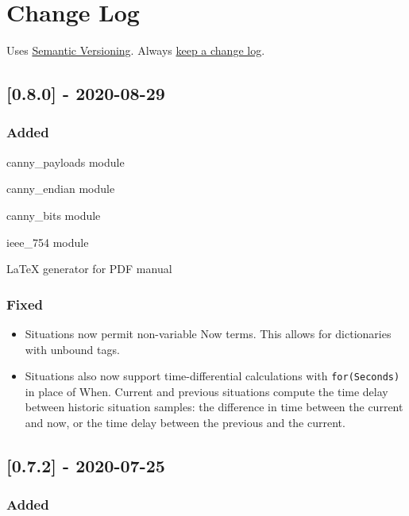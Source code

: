 \chapter{Change Log}

Uses \href{https://semver.org/}{Semantic Versioning}. Always \href{https://keepachangelog.com/en/1.0.0/}{keep a change
log}.

\section{[0.8.0] - 2020-08-29}

\subsection{Added}

\begin{shortlist}
    \item canny_payloads module
    \item canny_endian module
    \item canny_bits module
    \item ieee_754 module
    \item LaTeX generator for PDF manual
\end{shortlist}

\subsection{Fixed}

\begin{itemize}
    \item Situations now permit non-variable Now terms. This allows for dictionaries
with unbound tags.
    \item Situations also now support time-differential calculations with \verb$for(Seconds)$
in place of When. Current and previous situations compute the time delay
between historic situation samples: the difference in time between the current
and now, or the time delay between the previous and the current.
\end{itemize}

\section{[0.7.2] - 2020-07-25}

\subsection{Added}

